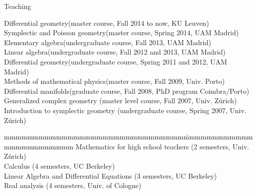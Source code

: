 \documentclass[12p]{resume}
\begin{document}
\begin{category}{Teaching}
\begin{tabbing}
Differential geometry\>(master course, Fall 2014 to now, KU Leuven)
\\
Symplectic and Poisson geometry\>(master course, Spring 2014, UAM Madrid)
\\
Elementary algebra\>(undergraduate course, Fall 2013,  UAM Madrid)\\
Linear algebra\>(undergraduate course, Fall 2012 and 2013,  UAM Madrid)\\
Differential geometry\>(undergraduate course, Spring 2011 and   2012,  UAM Madrid)\\
Methods of mathematical physics\>(master course, Fall 2009, Univ. Porto)
\\
Differential manifolds\>(graduate course, Fall 2008, PhD program Coimbra/Porto)\\
 Generalized complex geometry \>(master level course, Fall 2007, Univ. Z\"urich)\\
Introduction to symplectic geometry\> (undergraduate course, Spring 2007,  Univ. Z\"urich)
\end{tabbing} 

 
\vspace*{-0.2cm}
\begin{tabbing}
mmmmmmmmmmmmmmmmmmmmmmmmmmmmmmm\= mmmmmmmmmmmmmmmmmmmmmmmm \kill
Mathematics for high school teachers \>(2 semesters, Univ. Z\"urich)\\
Calculus \>(4 semesters, UC Berkeley)\\ 
Linear Algebra and Differential Equations \>(3 semesters, UC Berkeley) \\
Real analysis \> (4 semesters, Univ. of Cologne)
\end{tabbing}



\end{category}
\end{document}
